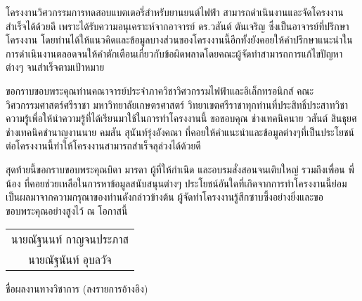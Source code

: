



\begin{acknowledgements}
	โครงงานวิศวกรรมการทดสอบแบตเตอรี่สำหรับยานยนต์ไฟฟ้า สามารถดำเนินงานและจัดโครงงานสำเร็จได้ด้วยดี เพราะได้รับความอนุเคราะห์จากอาจารย์ ดร.วสันต์ ตันเจริญ ซึ่งเป็นอาจารย์ที่ปรึกษาโครงงาน โดยท่านได้ให้แนวคิดและข้อมูลบางส่วนของโครงงานนี้อีกทั้งยังคอยให้คำปรึกษาแนะนำในการดำเนินงานตลอดจนให้คำตักเตือนเกี่ยวกับข้อผิดพลาดโดยคณะผู้จัดทำสามารถการแก้ไขปัญหาต่างๆ จนสำเร็จตามเป้าหมาย
 
ขอกราบขอบพระคุณท่านคณาจารย์ประจำภาควิชาวิศวกรรมไฟฟ้าและอิเล็กทรอนิกส์ คณะวิศวกรรมศาสตร์ศรีราชา มหาวิทยาลัยเกษตรศาสตร์ วิทยาเขตศรีราชาทุกท่านที่ประสิทธิ์ประสาทวิชาความรู้เพื่อให้นำความรู้ที่ได้เรียนมาใช้ในการทำโครงงานนี้ ขอขอบคุณ ช่างเทคนิคนาย วสันต์ สินธุยศ ช่างเทคนิคชำนาญงานนาย คมสัน สุนันท์รุ่งอังคณา ที่คอยให้คำแนะนำและข้อมูลต่างๆที่เป็นประโยชน์ต่อโครงงานนี้ทำให้โครงงานสามารถสำเร็จลุล่วงได้ด้วยดี

สุดท้ายนี้ขอกราบขอบพระคุณบิดา มารดา ผู้ที่ให้กำเนิด และอบรมสั่งสอนจนเติบใหญ่ รวมถึงเพื่อน พี่ น้อง ที่คอยช่วยเหลือในการหาข้อมูลสนับสนุนต่างๆ ประโยชน์อันใดที่เกิดจากการทำโครงงานนี้ย่อมเป็นผลมาจากความกรุณาของท่านดังกล่าวข้างต้น ผู้จัดทำโครงงานรู้สึกซาบซึ้งอย่างยิ่งและขอขอบพระคุณอย่างสูงไว้ ณ โอกาสนี้
\begin{flushright}
\begin{tabular}{@{}c@{}}
นายณัฐนนท์ กาญจนประภาส\\
นายณัฐนันท์ อุบลวัจ
\end{tabular}
\end{flushright}

\end{acknowledgements}



\begin{publications}
	ชื่อผลงานทางวิชาการ (ลงรายการอ้างอิง)
\end{publications}








